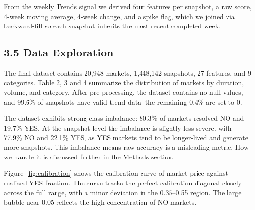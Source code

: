 \documentclass[11pt,twocolumn]{article}
\begin{document}
From the weekly Trends signal we derived four features per snapshot, a raw score, 4-week moving average, 4-week change, and a spike flag, which we joined via backward-fill so each snapshot inherits the most recent completed week.

\subsection*{3.5 Data Exploration}

The final dataset contains 20,948 markets, 1,448,142 snapshots, 27 features, and 9 categories. Table 2, 3 and 4 summarize the distribution of markets by duration, volume, and category. After pre-processing, the dataset contains no null values, and 99.6\% of snapshots have valid trend data; the remaining 0.4\% are set to 0.

The dataset exhibits strong class imbalance: 80.3\% of markets resolved NO and 19.7\% YES. At the snapshot level the imbalance is slightly less severe, with 77.9\% NO and 22.1\% YES, as YES markets tend to be longer-lived and generate more snapshots. This imbalance means raw accuracy is a misleading metric. How we handle it is discussed further in the Methods section.

Figure~\ref{fig:calibration} shows the calibration curve of market price against realized YES fraction. The curve tracks the perfect calibration diagonal closely across the full range, with a minor deviation in the 0.35–0.55 region. The large bubble near 0.05 reflects the high concentration of NO markets.
\end{document}
